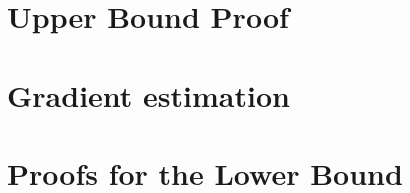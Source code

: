
\section{Upper Bound Proof}
\label{sec:appendix-md}


\section{Gradient estimation}
\label{sec:appendix-grad}


\section{Proofs for the Lower Bound}
\label{sec:appendix-lb-proof}



